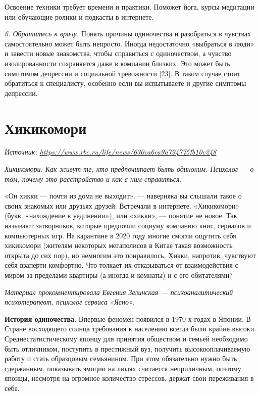 Освоение техники требует времени и практики.
Поможет йога, курсы медитации или обучающие ролики и подкасты в интернете.

\textit{6. Обратитесь к врачу.}
Понять причины одиночества и разобраться в чувствах самостоятельно
может быть непросто. Иногда недостаточно «выбраться в люди»
и завести новые знакомства, чтобы справиться с одиночеством,
а чувство изолированности сохраняется даже в компании близких.
Это может быть симптомом депрессии и социальной тревожности [23].
В таком случае стоит обратиться к специалисту,
особенно если вы испытываете и другие симптомы депрессии.



\newpage
\section{Хикикомори}

\textit{Источник: \url{https://www.rbc.ru/life/news/630ca6ea9a794775fb10c248}}

\textit{Хикикомори: Как живут те, кто предпочитает быть одиноким.
    Психолог --- о том, почему это расстройство и как с ним справиться.}

«Он хикки --- почти из дома не выходит»,
--- наверняка вы слышали такое о своих знакомых или друзьях друзей. Встречали в интернете. «Хикикомори» (букв. «нахождение в уединении»), или «хикки», — понятие не новое. Так называют затворников, которые предпочли социуму компанию книг, сериалов и компьютерных игр. На карантине в 2020 году многие смогли ощутить себя хикикомори (жителям некоторых мегаполисов в Китае такая возможность открыта до сих пор), но немногим это понравилось. Хикки, напротив, чувствуют себя взаперти комфортно. Что толкает их отказываться от взаимодействия с миром за пределами квартиры (а иногда и комнаты) и с его обитателями?

\textit{Материал прокомментировала Евгения Зелинская --- психоаналитический психотерапевт, психолог сервиса «Ясно».}

\textbf{История одиночества.}
Впервые феномен появился в 1970-х годах в Японии. В Стране восходящего солнца требования к населению всегда были крайне высоки. Среднестатистическому японцу для принятия обществом и семьей необходимо быть отличником, поступить в престижный вуз, получить высокооплачиваемую работу и стать образцовым семьянином. При этом обязательно нужно быть сдержанным, показывать эмоции на людях считается неприличным, поэтому японцы, несмотря на огромное количество стрессов, держат свои переживания в себе.

